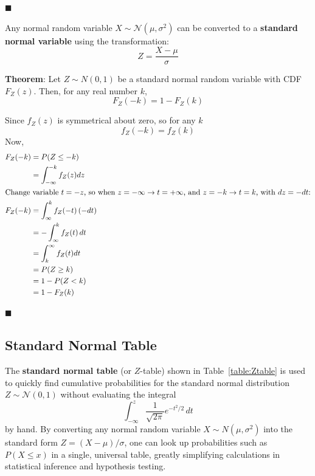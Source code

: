 \documentclass[twoside]{book}
\begin{document}
\hfill $\blacksquare$

Any normal random variable $X \sim \mathcal{N}(\mu, \sigma^2)$ can be converted to a \textbf{standard normal variable} using the transformation:
\[
Z = \dfrac{X - \mu}{\sigma}
\]

\begin{textbox}
\textbf{Theorem}: Let \( Z \sim N(0,1) \) be a standard normal random variable with CDF \( F_Z(z) \). Then, for any real number \( k \),
\[
F_Z(-k) = 1 - F_Z(k)
\]
\end{textbox}

Since $f_Z(z)$ is symmetrical about zero, so for any $k$
$$f_Z(-k) = f_Z(k)$$
Now,
\begin{align*}
F_Z(-k)
&= P(Z \le -k) \\
&= \int_{-\infty}^{-k} f_Z(z)dz\\
\intertext{Change variable $t=-z$, so when $z=-\infty\to t=+\infty$, and $z=-k\to t=k$, with $dz=-dt$:}
F_Z(-k) &= \int_{\infty}^{k} f_Z(-t)\,(-dt) \\
&= -\int_{\infty}^{k} f_Z(t)\,dt \\
&= \int_{k}^{\infty} f_Z(t)dt\\
&= P(Z \ge k)\\
&= 1 - P(Z < k)\\
&= 1 - F_Z(k)
\end{align*}

\hfill $\blacksquare$

\subsection{Standard Normal Table}

The \textbf{standard normal table} (or $Z$-table)  shown in Table~\ref{table:Ztable} is used to quickly find cumulative probabilities for the standard normal distribution \(Z\sim\mathcal{N}(0,1)\) without evaluating the integral $$\int_{-\infty}^z \frac{1}{\sqrt{2\pi}}e^{-t^2/2}\,dt$$ by hand.  By converting any normal random variable \(X\sim N(\mu,\sigma^2)\) into the standard form \(Z=(X-\mu)/\sigma\), one can look up probabilities such as \(P(X\le x)\) in a single, universal table, greatly simplifying calculations in statistical inference and hypothesis testing.
\end{document}
